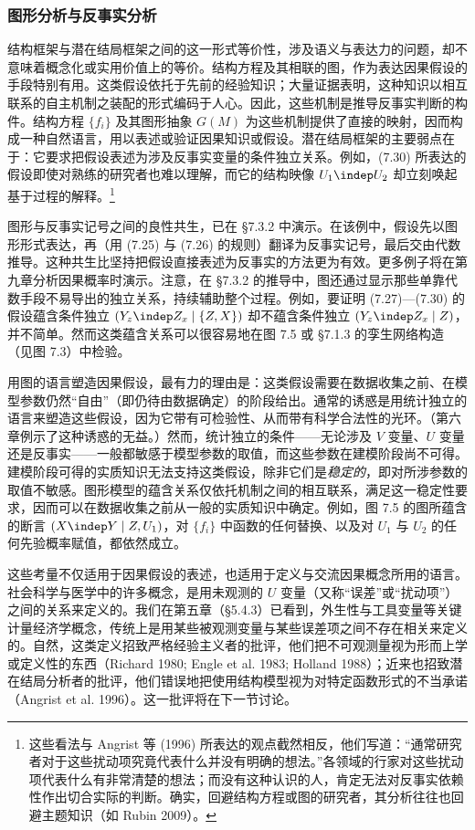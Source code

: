 \subsubsection*{图形分析与反事实分析}

结构框架与潜在结局框架之间的这一形式等价性，涉及语义与表达力的问题，却不意味着概念化或实用价值上的等价。结构方程及其相联的图，作为表达因果假设的手段特别有用。这类假设依托于先前的经验知识；大量证据表明，这种知识以相互联系的自主机制之装配的形式编码于人心。因此，这些机制是推导反事实判断的构件。结构方程 $\{f_i\}$ 及其图形抽象 $G(M)$ 为这些机制提供了直接的映射，因而构成一种自然语言，用以表述或验证因果知识或假设。潜在结局框架的主要弱点在于：它要求把假设表述为涉及反事实变量的条件独立关系。例如，\textup{(7.30)} 所表达的假设即使对熟练的研究者也难以理解，而它的结构映像 $U_1\indep U_2$ 却立刻唤起基于过程的解释。\footnote{这些看法与 Angrist 等 (1996) 所表达的观点截然相反，他们写道：“通常研究者对于这些扰动项究竟代表什么并没有明确的想法。”各领域的行家对这些扰动项代表什么有非常清楚的想法；而没有这种认识的人，肯定无法对反事实依赖性作出切合实际的判断。确实，回避结构方程或图的研究者，其分析往往也回避主题知识（如 Rubin 2009）。}

图形与反事实记号之间的良性共生，已在 \S 7.3.2 中演示。在该例中，假设先以图形形式表达，再（用 \textup{(7.25)} 与 \textup{(7.26)} 的规则）翻译为反事实记号，最后交由代数推导。这种共生比坚持把假设直接表述为反事实的方法更为有效。更多例子将在第九章分析因果概率时演示。注意，在 \S 7.3.2 的推导中，图还通过显示那些单靠代数手段不易导出的独立关系，持续辅助整个过程。例如，要证明 \textup{(7.27)}—\textup{(7.30)} 的假设蕴含条件独立 $(Y_z\indep Z_x\mid\{Z,X\})$ 却不蕴含条件独立 $(Y_z\indep Z_x\mid Z)$，并不简单。然而这类蕴含关系可以很容易地在图 7.5 或 \S 7.1.3 的孪生网络构造（见图 7.3）中检验。

用图的语言塑造因果假设，最有力的理由是：这类假设需要在数据收集之前、在模型参数仍然“自由”（即仍待由数据确定）的阶段给出。通常的诱惑是用统计独立的语言来塑造这些假设，因为它带有可检验性、从而带有科学合法性的光环。（第六章例示了这种诱惑的无益。）然而，统计独立的条件——无论涉及 $V$ 变量、$U$ 变量还是反事实——一般都敏感于模型参数的取值，而这些参数在建模阶段尚不可得。建模阶段可得的实质知识无法支持这类假设，除非它们是\emph{稳定的}，即对所涉参数的取值不敏感。图形模型的蕴含关系仅依托机制之间的相互联系，满足这一稳定性要求，因而可以在数据收集之前从一般的实质知识中确定。例如，图 7.5 的图所蕴含的断言 $(X\indep Y\mid Z,U_1)$，对 $\{f_i\}$ 中函数的任何替换、以及对 $U_1$ 与 $U_2$ 的任何先验概率赋值，都依然成立。

这些考量不仅适用于因果假设的表述，也适用于定义与交流因果概念所用的语言。社会科学与医学中的许多概念，是用未观测的 $U$ 变量（又称“误差”或“扰动项”）之间的关系来定义的。我们在第五章（\S 5.4.3）已看到，外生性与工具变量等关键计量经济学概念，传统上是用某些被观测变量与某些误差项之间不存在相关来定义的。自然，这类定义招致严格经验主义者的批评，他们把不可观测量视为形而上学或定义性的东西（Richard 1980; Engle et al. 1983; Holland 1988）；近来也招致潜在结局分析者的批评，他们错误地把使用结构模型视为对特定函数形式的不当承诺（Angrist et al. 1996）。这一批评将在下一节讨论。

